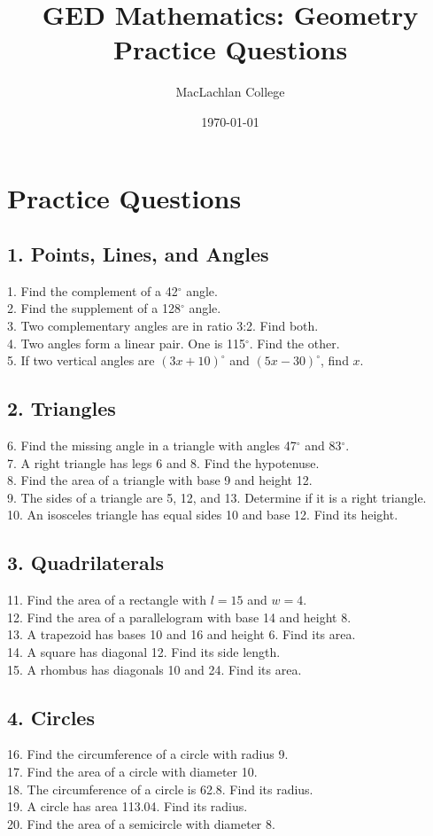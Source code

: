 \documentclass[12pt]{article}
\title{GED Mathematics: Geometry Practice Questions}
\author{MacLachlan College}
\date{\today}
\begin{document}
\maketitle

\section*{Practice Questions}

\subsection*{1. Points, Lines, and Angles}
1. Find the complement of a 42$^\circ$ angle.\\
2. Find the supplement of a 128$^\circ$ angle.\\
3. Two complementary angles are in ratio 3:2. Find both.\\
4. Two angles form a linear pair. One is 115$^\circ$. Find the other.\\
5. If two vertical angles are $(3x+10)^\circ$ and $(5x-30)^\circ$, find $x$.

\subsection*{2. Triangles}
6. Find the missing angle in a triangle with angles 47$^\circ$ and 83$^\circ$.\\
7. A right triangle has legs 6 and 8. Find the hypotenuse.\\
8. Find the area of a triangle with base 9 and height 12.\\
9. The sides of a triangle are 5, 12, and 13. Determine if it is a right triangle.\\
10. An isosceles triangle has equal sides 10 and base 12. Find its height.

\subsection*{3. Quadrilaterals}
11. Find the area of a rectangle with $l=15$ and $w=4$.\\
12. Find the area of a parallelogram with base 14 and height 8.\\
13. A trapezoid has bases 10 and 16 and height 6. Find its area.\\
14. A square has diagonal 12. Find its side length.\\
15. A rhombus has diagonals 10 and 24. Find its area.

\subsection*{4. Circles}
16. Find the circumference of a circle with radius 9.\\
17. Find the area of a circle with diameter 10.\\
18. The circumference of a circle is 62.8. Find its radius.\\
19. A circle has area 113.04. Find its radius.\\
20. Find the area of a semicircle with diameter 8.
\end{document}
